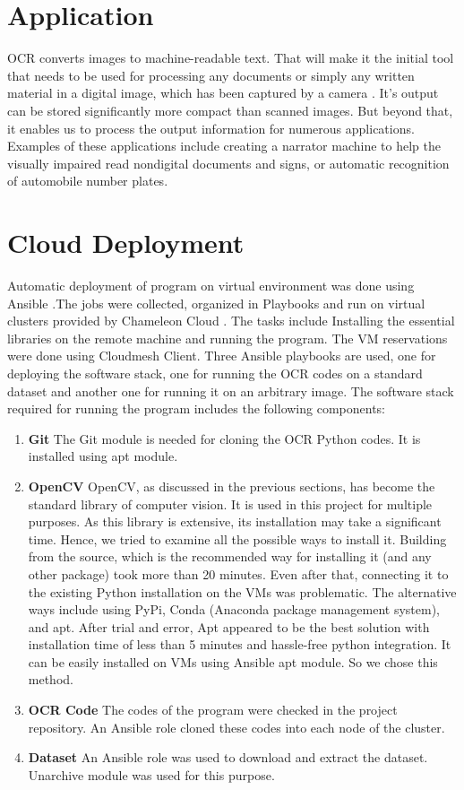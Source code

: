 \documentclass[9pt,twocolumn,twoside]{../../styles/osajnl}
\begin{document}
\section{Application}

OCR converts images to machine-readable text. That will make it the
initial tool that needs to be used for processing any documents or
simply any written material in a digital image, which has been
captured by a camera \cite{www-ocr-wiki}. It’s output can be stored significantly more
compact than scanned images. But beyond that, it enables us to process
the output information for numerous applications. Examples of these
applications include creating a narrator machine to help the visually
impaired read nondigital documents and signs, or automatic recognition
of automobile number plates.


\section{Cloud Deployment} 

Automatic deployment of program on virtual environment was done using
Ansible \cite{www-ansible} .The jobs were collected, organized in 
Playbooks \cite{www-ansible-playbook} and run on virtual clusters provided
by Chameleon Cloud \cite{www-chameleoncloud}.
The tasks include Installing the essential libraries on the remote machine
and running the program.
The VM reservations were done using Cloudmesh Client. Three Ansible playbooks are used, one for 
deploying the software stack, one for running the OCR codes on a standard dataset
and another one for running it on an arbitrary image. The software stack
required for running the program includes the following components:
\begin{enumerate}
\item {\bfseries Git} The Git module is needed for cloning the OCR Python codes. 
It is installed using apt module.
\item{\bfseries OpenCV} OpenCV, as discussed in the previous sections, has become 
the standard library of computer vision. It is used in this project for multiple 
purposes. As this library is extensive, its installation may take a significant time.
Hence, we tried to examine all the possible ways to install it. Building from the source,
which is the recommended way for installing it (and any other package) took more than
20 minutes. Even after that, connecting it to the existing Python installation on the
VMs was problematic. The alternative ways include using PyPi, Conda (Anaconda package
management system), and apt. After trial and error, Apt appeared to be the best solution
with installation time of less than 5 minutes and hassle-free python integration. It can 
be easily installed on VMs using Ansible apt module. So we chose this method.
\item {\bfseries OCR Code} The codes of the program were checked in the project
repository. An Ansible role cloned these codes into each node of the cluster.
\item{\bfseries Dataset} An Ansible role was used to download and extract the
dataset. Unarchive module was used for this purpose.
\end{enumerate}
\end{document}
